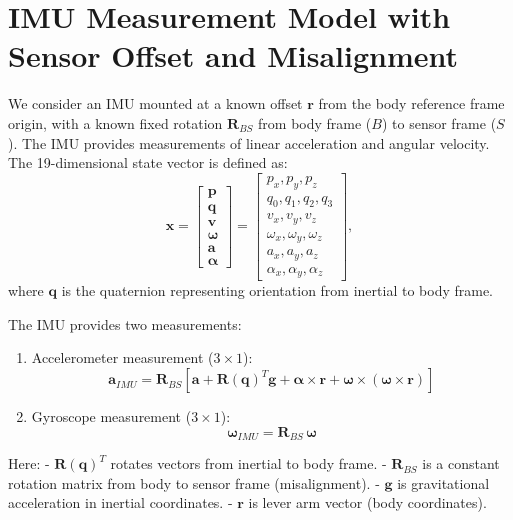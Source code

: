 \documentclass{article}
\begin{document}
	\section*{IMU Measurement Model with Sensor Offset and Misalignment}

	We consider an IMU mounted at a known offset $\mathbf{r}$ from the body reference frame origin, with a known fixed rotation $\mathbf{R}_{BS}$ from body frame ($B$) to sensor frame ($S$). The IMU provides measurements of linear acceleration and angular velocity. The 19-dimensional state vector is defined as:
	\[
	\mathbf{x} = \begin{bmatrix}
		\mathbf{p} \\[4pt]
		\mathbf{q} \\[4pt]
		\mathbf{v} \\[4pt]
		\boldsymbol{\omega} \\[4pt]
		\mathbf{a} \\[4pt]
		\boldsymbol{\alpha}
	\end{bmatrix}
	=
	\begin{bmatrix}
		p_x, p_y, p_z \\[4pt]
		q_0, q_1, q_2, q_3 \\[4pt]
		v_x, v_y, v_z \\[4pt]
		\omega_x, \omega_y, \omega_z \\[4pt]
		a_x, a_y, a_z \\[4pt]
		\alpha_x, \alpha_y, \alpha_z
	\end{bmatrix},
	\]
	where $\mathbf{q}$ is the quaternion representing orientation from inertial to body frame.

	The IMU provides two measurements:

	\begin{enumerate}
		\item Accelerometer measurement ($3\times1$):
		$$
		\mathbf{a}_{IMU} = \mathbf{R}_{BS}\left[\mathbf{a} + \mathbf{R(q)}^T \mathbf{g} + \boldsymbol{\alpha}\times \mathbf{r} + \boldsymbol{\omega}\times(\boldsymbol{\omega}\times \mathbf{r})\right]
		$$

		\item Gyroscope measurement ($3\times1$):
		$$
		\boldsymbol{\omega}_{IMU} = \mathbf{R}_{BS}\,\boldsymbol{\omega}
		$$
	\end{enumerate}

	Here:
	- $\mathbf{R(q)}^T$ rotates vectors from inertial to body frame.
	- $\mathbf{R}_{BS}$ is a constant rotation matrix from body to sensor frame (misalignment).
	- $\mathbf{g}$ is gravitational acceleration in inertial coordinates.
	- $\mathbf{r}$ is lever arm vector (body coordinates).
\end{document}
